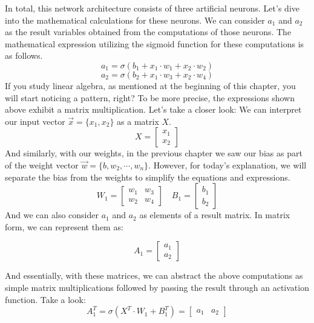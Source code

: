 In total, this network architecture consists of three artificial neurons. Let's dive into the mathematical
calculations for these neurons. We can consider $a_1$ and $a_2$ as the result variables obtained from the
computations of those neurons. The mathematical expression utilizing the sigmoid function for these
computations is as follows.
\[
a_1 = \sigma(b_1 + x_1 \cdot w_1 + x_2 \cdot w_2)
\]
\[
a_2 = \sigma(b_2 + x_1 \cdot w_3 + x_2 \cdot w_4)
\]
If you study linear algebra, as mentioned at the beginning of this chapter, you will start noticing a pattern,
right? To be more precise, the expressions shown above exhibit a matrix multiplication. Let's take a closer
look: We can interpret our input vector $\vec{x} = \{x_1, x_2\}$ as a matrix $X$.
\[
X = \begin{bmatrix} x_1 \\ x_2 \end{bmatrix}
\]
And similarly, with our weights, in the previous chapter we saw our bias as part of the weight vector
$\vec{w} = \{b, w_2, \cdots, w_n\}$. However, for today's explanation, we will separate the bias
from the weights to simplify the equations and expressions.
\[
W_1 = \begin{bmatrix} w_1 & w_3 \\ w_2 & w_4 \end{bmatrix}
\quad
B_1 = \begin{bmatrix} b_1 \\ b_2 \end{bmatrix}
\]
And we can also consider $a_1$ and $a_2$ as elements of a result matrix. In matrix form, we can represent
them as:

\[
A_1 = \begin{bmatrix} a_1 \\ a_2 \end{bmatrix}
\]

And essentially, with these matrices, we can abstract the above computations as simple matrix
multiplications followed by passing the result through an activation function. Take a look:
\[
A_1^T = \sigma(X^T \cdot W_1 + B_1^T) = \begin{bmatrix} a_1 & a_2 \end{bmatrix}
\]


